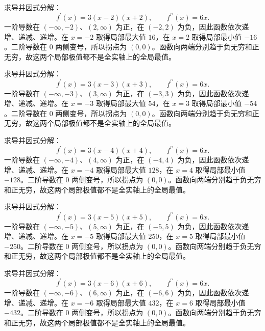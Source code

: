 \documentclass[12pt,fontset=fandol]{ctexart}
\begin{document}
\begin{solve}\label{ans:c11q3}
求导并因式分解：
\[
f^{\prime}(x)=3(x-2)(x+2),\qquad f^{\prime\prime}(x)=6x.
\]
一阶导数在 $(-\infty,-2)$、$(2,\infty)$ 为正，在 $(-2,2)$ 为负，因此函数依次递增、递减、递增。在 $x=-2$ 取得局部最大值 $16$，在 $x=2$ 取得局部最小值 $-16$。二阶导数在 $0$ 两侧变号，所以拐点为 $(0,0)$。函数向两端分别趋于负无穷和正无穷，故这两个局部极值都不是全实轴上的全局最值。
\end{solve}

\begin{solve}\label{ans:c11q4}
求导并因式分解：
\[
f^{\prime}(x)=3(x-3)(x+3),\qquad f^{\prime\prime}(x)=6x.
\]
一阶导数在 $(-\infty,-3)$、$(3,\infty)$ 为正，在 $(-3,3)$ 为负，因此函数依次递增、递减、递增。在 $x=-3$ 取得局部最大值 $54$，在 $x=3$ 取得局部最小值 $-54$。二阶导数在 $0$ 两侧变号，所以拐点为 $(0,0)$。函数向两端分别趋于负无穷和正无穷，故这两个局部极值都不是全实轴上的全局最值。
\end{solve}

\begin{solve}\label{ans:c11q5}
求导并因式分解：
\[
f^{\prime}(x)=3(x-4)(x+4),\qquad f^{\prime\prime}(x)=6x.
\]
一阶导数在 $(-\infty,-4)$、$(4,\infty)$ 为正，在 $(-4,4)$ 为负，因此函数依次递增、递减、递增。在 $x=-4$ 取得局部最大值 $128$，在 $x=4$ 取得局部最小值 $-128$。二阶导数在 $0$ 两侧变号，所以拐点为 $(0,0)$。函数向两端分别趋于负无穷和正无穷，故这两个局部极值都不是全实轴上的全局最值。
\end{solve}

\begin{solve}\label{ans:c11q6}
求导并因式分解：
\[
f^{\prime}(x)=3(x-5)(x+5),\qquad f^{\prime\prime}(x)=6x.
\]
一阶导数在 $(-\infty,-5)$、$(5,\infty)$ 为正，在 $(-5,5)$ 为负，因此函数依次递增、递减、递增。在 $x=-5$ 取得局部最大值 $250$，在 $x=5$ 取得局部最小值 $-250$。二阶导数在 $0$ 两侧变号，所以拐点为 $(0,0)$。函数向两端分别趋于负无穷和正无穷，故这两个局部极值都不是全实轴上的全局最值。
\end{solve}

\begin{solve}\label{ans:c11q7}
求导并因式分解：
\[
f^{\prime}(x)=3(x-6)(x+6),\qquad f^{\prime\prime}(x)=6x.
\]
一阶导数在 $(-\infty,-6)$、$(6,\infty)$ 为正，在 $(-6,6)$ 为负，因此函数依次递增、递减、递增。在 $x=-6$ 取得局部最大值 $432$，在 $x=6$ 取得局部最小值 $-432$。二阶导数在 $0$ 两侧变号，所以拐点为 $(0,0)$。函数向两端分别趋于负无穷和正无穷，故这两个局部极值都不是全实轴上的全局最值。
\end{solve}
\end{document}
